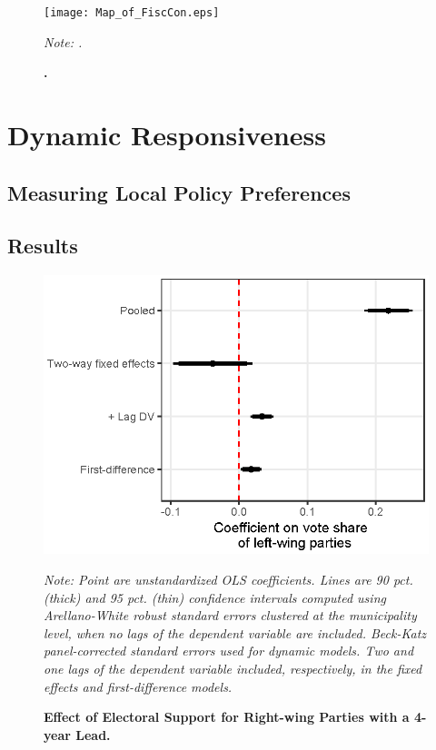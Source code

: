 \documentclass[a4paper,12pt]{article}
\newcommand\fnote[1]{\captionsetup{font=small}\caption*{#1}}
\begin{document}
\begin{landscape}
	\begin{figure}[!htb]
		\centering
		\texttt{[image: Map\_of\_FiscCon.eps]}
		\caption{\textbf{.}} \fnote{\emph{Note: .}}
		\label{fig:PermTest}
	\end{figure}
\end{landscape}


\section{Dynamic Responsiveness}

\subsection{Measuring Local Policy Preferences}

\subsection{Results}



\begin{figure}[h]
	\centering
	\includegraphics[scale = 1.1]{ggplot_coef_inflation_adjusted.eps}
	\caption{\textbf{Effect of Electoral Support for Right-wing Parties with a 4-year Lead.}} \fnote{\emph{Note: Point are unstandardized OLS coefficients. Lines are 90 pct. (thick) and 95 pct. (thin) confidence intervals computed using Arellano-White robust standard errors clustered at the municipality level, when no lags of the dependent variable are included. Beck-Katz panel-corrected standard errors used for dynamic models. Two and one lags of the dependent variable included, respectively, in the fixed effects and first-difference models.}}
	\label{fig:FourYearLead}
\end{figure}
\end{document}

